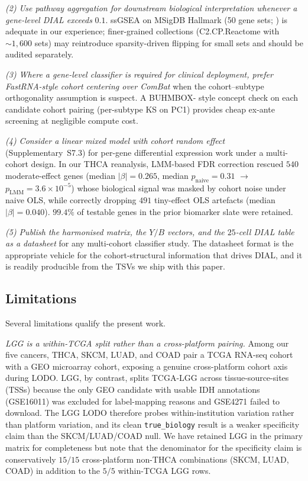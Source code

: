 \documentclass[11pt,a4paper]{article}
\begin{document}
\emph{(2) Use pathway aggregation for downstream biological
interpretation whenever a gene-level DIAL exceeds} $0.1$. ssGSEA on
MSigDB Hallmark (50 gene sets; \citep{liberzon2015hallmark}) is
adequate in our experience; finer-grained collections (C2.CP.Reactome
with $\sim 1{,}600$ sets) may reintroduce sparsity-driven flipping
for small sets and should be audited separately.

\emph{(3) Where a gene-level classifier is required for clinical
deployment, prefer FastRNA-style cohort centering over ComBat} when
the cohort--subtype orthogonality assumption is suspect. A BUHMBOX-
style concept check \citep{han2016buhmbox} on each candidate cohort
pairing (per-subtype KS on PC1) provides cheap ex-ante screening at
negligible compute cost.

\emph{(4) Consider a linear mixed model with cohort random effect}
(Supplementary~S7.3) for per-gene differential expression work
under a multi-cohort design. In our THCA reanalysis, LMM-based FDR
correction rescued $540$ moderate-effect genes (median
$|\beta| = 0.265$, median $p_{\mathrm{naive}} = 0.31$ $\to$
$p_{\mathrm{LMM}} = 3.6 \times 10^{-5}$) whose biological signal was
masked by cohort noise under naive OLS, while correctly dropping
$491$ tiny-effect OLS artefacts
(median $|\beta| = 0.040$). $99.4\%$ of testable genes in the prior
biomarker slate were retained.

\emph{(5) Publish the harmonised matrix, the $Y/B$ vectors, and the
$25$-cell DIAL table as a datasheet} \citep{gebru2021datasheets} for
any multi-cohort classifier study. The datasheet format is the
appropriate vehicle for the cohort-structural information that
drives DIAL, and it is readily producible from the TSVs we ship with
this paper.

\subsection{Limitations}
Several limitations qualify the present work.

\emph{LGG is a within-TCGA split rather than a cross-platform
pairing.} Among our five cancers, THCA, SKCM, LUAD, and COAD pair a
TCGA RNA-seq cohort with a GEO microarray cohort, exposing a genuine
cross-platform cohort axis during LODO. LGG, by contrast, splits
TCGA-LGG across tissue-source-sites (TSSs) because the only GEO
candidate with usable IDH annotations (GSE16011) was excluded for
label-mapping reasons and GSE4271 failed to download. The LGG LODO
therefore probes within-institution variation rather than
platform variation, and its clean \texttt{true\_biology} result is a
weaker specificity claim than the SKCM/LUAD/COAD null. We have
retained LGG in the primary matrix for completeness but note that
the denominator for the specificity claim is conservatively
$15 / 15$ cross-platform non-THCA combinations (SKCM, LUAD, COAD) in
addition to the $5 / 5$ within-TCGA LGG rows.
\end{document}
